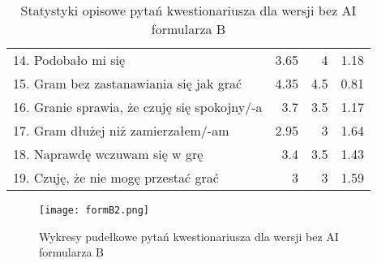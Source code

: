 \begin{table}[h!]
\begin{center}
\begin{tabular}{|m{10em}|r|r|r|}
            14. Podobało mi się                                               & 3.65          & 4       & 1.18           \\
            15. Gram bez zastanawiania się jak grać                           & 4.35          & 4.5     & 0.81           \\
            16. Granie sprawia, \newline że czuję się spokojny/-a             & 3.7           & 3.5     & 1.17           \\
            17. Gram dłużej \newline niż zamierzałem/-am                      & 2.95          & 3       & 1.64           \\
            18. Naprawdę wczuwam się w grę                                    & 3.4           & 3.5     & 1.43           \\
            19. Czuję, że nie mogę przestać grać                              & 3             & 3       & 1.59           \\
            \hline
        \end{tabular}
    \end{center}
    \caption{Statystyki opisowe pytań kwestionariusza dla wersji bez AI formularza B}\label{tab1:appendixB_9}
\end{table}

\begin{figure}[h!]
    \centering
    \texttt{[image: formB2.png]}
    \caption{Wykresy pudełkowe pytań kwestionariusza dla wersji bez AI formularza B}
    \label{fig:ch7_formB2}
\end{figure}